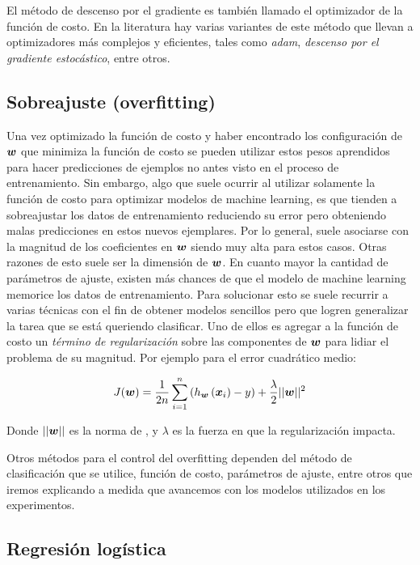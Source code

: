 El método de descenso por el gradiente es también llamado el
optimizador de la función de costo. En la literatura hay varias variantes de
este método que llevan a optimizadores más complejos y eficientes, tales como
\emph{adam}, \emph{descenso por el gradiente estocástico}, entre otros.

\subsection{Sobreajuste (overfitting)}

Una vez optimizado la función de costo y haber encontrado los configuración de
$\boldsymbol{w}$ que minimiza la función de costo se pueden utilizar estos pesos
aprendidos para hacer predicciones de ejemplos no antes visto en el proceso de
entrenamiento. Sin embargo, algo que suele ocurrir al utilizar solamente la
función de costo para optimizar modelos de machine learning, es que tienden a
sobreajustar los datos de entrenamiento reduciendo su error pero obteniendo
malas predicciones en estos nuevos ejemplares. Por lo general, suele asociarse
con la magnitud de los coeficientes en $\boldsymbol{w}$ siendo muy alta para
estos casos. Otras razones de esto suele ser la dimensión de $\boldsymbol{w}$. En
cuanto mayor la cantidad de parámetros de ajuste, existen más chances de que el
modelo de machine learning memorice los datos de entrenamiento. Para solucionar esto se suele
recurrir a varias técnicas con el fin de obtener modelos sencillos pero que
logren generalizar la tarea que se está queriendo clasificar. Uno de ellos es
agregar a la función de costo un \emph{término de regularización} sobre las
componentes de $\boldsymbol{w}$ para lidiar el problema de su magnitud. Por ejemplo para
el error cuadrático medio:

\begin{align}
    J(\boldsymbol{w}) = \frac{1}{2n} \sum_{i=1}^{n}\left( h_{\boldsymbol{w}}\left( \boldsymbol{x}_{i}\right) - y \right) +
                  \frac{\lambda}{2} ||\boldsymbol{w}||^{2}
\end{align}

Donde $||\boldsymbol{w}||$ es la norma de , y $\lambda$ es la fuerza en que la regularización impacta.

Otros métodos para el control del overfitting dependen del método de
clasificación que se utilice, función de costo, parámetros de ajuste, entre
otros que iremos explicando a medida que avancemos con los modelos utilizados en
los experimentos.

\subsection{Regresión logística}

